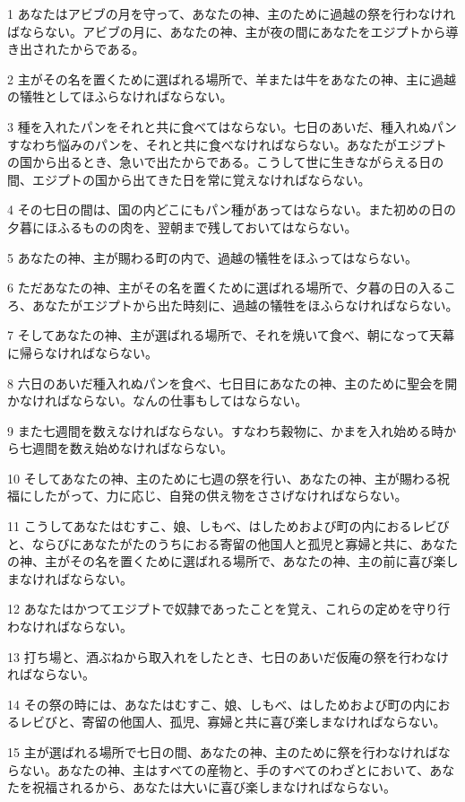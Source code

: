 \par 1 あなたはアビブの月を守って、あなたの神、主のために過越の祭を行わなければならない。アビブの月に、あなたの神、主が夜の間にあなたをエジプトから導き出されたからである。
\par 2 主がその名を置くために選ばれる場所で、羊または牛をあなたの神、主に過越の犠牲としてほふらなければならない。
\par 3 種を入れたパンをそれと共に食べてはならない。七日のあいだ、種入れぬパンすなわち悩みのパンを、それと共に食べなければならない。あなたがエジプトの国から出るとき、急いで出たからである。こうして世に生きながらえる日の間、エジプトの国から出てきた日を常に覚えなければならない。
\par 4 その七日の間は、国の内どこにもパン種があってはならない。また初めの日の夕暮にほふるものの肉を、翌朝まで残しておいてはならない。
\par 5 あなたの神、主が賜わる町の内で、過越の犠牲をほふってはならない。
\par 6 ただあなたの神、主がその名を置くために選ばれる場所で、夕暮の日の入るころ、あなたがエジプトから出た時刻に、過越の犠牲をほふらなければならない。
\par 7 そしてあなたの神、主が選ばれる場所で、それを焼いて食べ、朝になって天幕に帰らなければならない。
\par 8 六日のあいだ種入れぬパンを食べ、七日目にあなたの神、主のために聖会を開かなければならない。なんの仕事もしてはならない。
\par 9 また七週間を数えなければならない。すなわち穀物に、かまを入れ始める時から七週間を数え始めなければならない。
\par 10 そしてあなたの神、主のために七週の祭を行い、あなたの神、主が賜わる祝福にしたがって、力に応じ、自発の供え物をささげなければならない。
\par 11 こうしてあなたはむすこ、娘、しもべ、はしためおよび町の内におるレビびと、ならびにあなたがたのうちにおる寄留の他国人と孤児と寡婦と共に、あなたの神、主がその名を置くために選ばれる場所で、あなたの神、主の前に喜び楽しまなければならない。
\par 12 あなたはかつてエジプトで奴隷であったことを覚え、これらの定めを守り行わなければならない。
\par 13 打ち場と、酒ぶねから取入れをしたとき、七日のあいだ仮庵の祭を行わなければならない。
\par 14 その祭の時には、あなたはむすこ、娘、しもべ、はしためおよび町の内におるレビびと、寄留の他国人、孤児、寡婦と共に喜び楽しまなければならない。
\par 15 主が選ばれる場所で七日の間、あなたの神、主のために祭を行わなければならない。あなたの神、主はすべての産物と、手のすべてのわざとにおいて、あなたを祝福されるから、あなたは大いに喜び楽しまなければならない。
